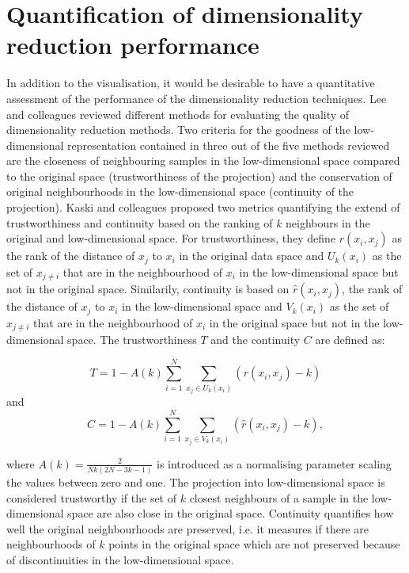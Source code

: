 \section{Quantification of dimensionality reduction performance}
\label{section:Quantification-DimRed}
In addition to the visualisation, it would be desirable to have a quantitative assessment of the performance of the dimensionality reduction techniques. Lee and colleagues \citeyear{Lee2009} reviewed different methods for evaluating the quality of dimensionality reduction methods. Two criteria for the goodness of the low-dimensional representation contained in three out of the five methods reviewed are the closeness of neighbouring samples in the low-dimensional space compared to the original space (trustworthiness of the projection) and the conservation of original neighbourhoods in the low-dimensional space (continuity of the projection). Kaski and colleagues \citep{Kaski2003} proposed two metrics quantifying the extend of trustworthiness and continuity based on the ranking of \(k\) neighbours in the original and low-dimensional space. For trustworthiness, they define \(r(x_i, x_j)\) as the rank of the distance of \(x_j\) to  \(x_i\) in the original data space and \(U_k(x_i)\) as the set of \(x_{j \neq i}\) that are in the neighbourhood of \(x_i\) in the low-dimensional space but not in the original space. Similarily, continuity is based on \(\hat{r}(x_i, x_j)\), the rank of the distance of \(x_j\) to  \(x_i\) in the low-dimensional space and \(V_k(x_i)\) as the set of \(x_{j \neq i}\) that are in the neighbourhood of \(x_i\) in the original space but not in the low-dimensional space. The trustworthiness \(T\) and the continuity \(C\) are defined as:

\begin{equation}
T =  1- A(k)\sum^{N}_{i=1}\sum^{}_{x_j \in U_k(x_i)}(r(x_i, x_j) - k)
\label{eq:trustworthiness}
\end{equation}
and 
\begin{equation}
C =  1- A(k)\sum^{N}_{i=1}\sum^{}_{x_j \in V_k(x_i)}(\hat{r}(x_i, x_j) - k),
\label{eq:continuity}
\end{equation}

where \(A(k) = \frac{2}{Nk(2N -3k -1)}\) is introduced as a normalising parameter scaling the values between zero and one. The projection into low-dimensional space is considered trustworthy if the set of \(k\) closest neighbours of a sample in the low-dimensional space are also close in the original space. Continuity quantifies how well the original neighbourhoods are preserved, i.e. it measures if there are neighbourhoods of \(k\) points in the original space which are not preserved because of discontinuities in the low-dimensional space. 

